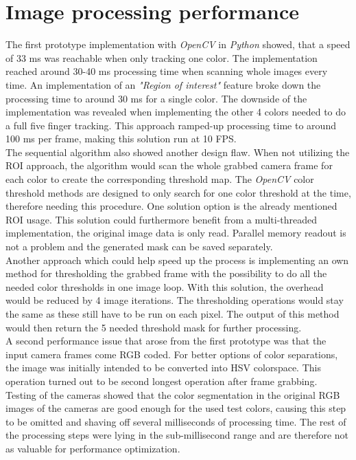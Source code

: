 \section{Image processing performance}
The first prototype implementation with \textit{OpenCV} in \textit{Python} showed, that a speed of 33 ms was reachable when only tracking one color. The implementation reached around 30-40 ms processing time when scanning whole images every time. An implementation of an \textit{"Region of interest"} feature broke down the processing time to around 30 ms for a single color. The downside of the implementation was revealed when implementing the other 4 colors needed to do a full five finger tracking. This approach ramped-up processing time to around 100 ms per frame, making this solution run at 10 FPS.\\ 
The sequential algorithm also showed another design flaw. When not utilizing the ROI approach, the algorithm would scan the whole grabbed camera frame for each color to create the corresponding threshold map. The \textit{OpenCV} color threshold methods are designed to only search for one color threshold at the time, therefore needing this procedure. One solution option is the already mentioned ROI usage. This solution could furthermore benefit from a multi-threaded implementation, the original image data is only read. Parallel memory readout is not a problem and the generated mask can be saved separately.\\
Another approach which could help speed up the process is implementing an own method for thresholding the grabbed frame with the possibility to do all the needed color thresholds in one image loop. With this solution, the overhead would be reduced by 4 image iterations. The thresholding operations would stay the same as these still have to be run on each pixel. The output of this method would then return the 5 needed threshold mask for further processing.\\
A second performance issue that arose from the first prototype was that the input camera frames come RGB coded. For better options of color separations, the image was initially intended to be converted into HSV colorspace. This operation turned out to be second longest operation after frame grabbing. \\Testing of the cameras showed that the color segmentation in the original RGB images of the cameras are good enough for the used test colors, causing this step to be omitted and shaving off several milliseconds of processing time.
The rest of the processing steps were lying in the sub-millisecond range and are therefore not as valuable for performance optimization.
